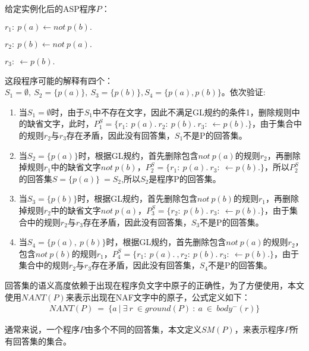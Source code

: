 \begin{example}

给定实例化后的ASP程序$P$：

$r_1: \ p(a) \leftarrow not \ p(b).$

$r_2: \ p(b) \leftarrow not \ p(a).$

$r_3: \  \leftarrow p(b).$

这段程序可能的解释有四个： $S_1 = \emptyset , \ S_2  =\{p(a)\}, \ S_3  =\{p(b)\},S_4  =\{p(a),p(b)\}$。依次验证:
\begin{enumerate}[label=(\arabic*),topsep=0pt]
    \setlength\itemsep{-0.3em}
    \item 当$S_1 = \emptyset$时，由于$S_1$中不存在文字，因此不满足GL规约的条件1，删除规则中的缺省文字，此时，$P^S_1 = \{r_1: \ p(a). \  r_2: \ p(b).\ r_3: \  \leftarrow p(b).\}$，由于集合中的规则$r_2$与$r_3$存在矛盾，因此没有回答集，$S_1$不是P的回答集。
    \item 当$S_2 = \{p(a)\}$时，根据GL规约，首先删除包含$not \ p(a)$的规则$r_2$，再删除掉规则$r_1$中的缺省文字$not \ p(b)$，$P^S_2 = \{r_1: \ p(a). \ r_3: \  \leftarrow p(b).\}$，所以$P^S_2$的回答集$S = \{p(a)\} \ = S_2$,所以$S_2$是程序P的回答集。
    \item 当$S_3 = \{p(b)\}$时，根据GL规约，首先删除包含$not \ p(b)$的规则$r_1$，再删除掉规则$r_2$中的缺省文字$not \ p(a)$，$P^S_3 = \{r_2: \ p(b). \ r_3: \  \leftarrow p(b).\}$，由于集合中的规则$r_2$与$r_3$存在矛盾，因此没有回答集，$S_3$不是P的回答集。
    \item 当$S_4 = \{p(a),\ p(b)\}$时，根据GL规约，首先删除包含$not \ p(a)$的规则$r_2$，包含$not \ p(b)$的规则$r_1$，$P^S_4 = \{r_1: \ p(a). \ ,r_2: \ p(b). \ r_3: \  \leftarrow p(b).\}$，由于集合中的规则$r_2$与$r_3$存在矛盾，因此没有回答集，$S_4$不是P的回答集。
\end{enumerate}
\end{example}
\begin{definition}
回答集的语义高度依赖于出现在程序负文字中原子的正确性，为了方便使用，本文使用$NANT(P)$来表示出现在NAF文字中的原子，公式定义如下：
\begin{align}
    \label{rule:5}
    NANT(P) \ = \ \{a \ | \ \exists \ r \ \in ground(P)\ : \ a \ \in \ body^-(r) \}
\end{align}
\end{definition}
\begin{definition}
通常来说，一个程序$P$由多个不同的回答集，本文定义$SM(P)$，来表示程序$P$所有回答集的集合。
\end{definition}

